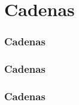 \documentclass{beamer}
\begin{document}
\section{Cadenas}
\begin{frame}[fragile]
  \frametitle{Cadenas}
  
\end{frame}

\begin{frame}[fragile]
  \frametitle{Cadenas}
  
\end{frame}

\begin{frame}[fragile]
  \frametitle{Cadenas}
  
\end{frame}
\end{document}
